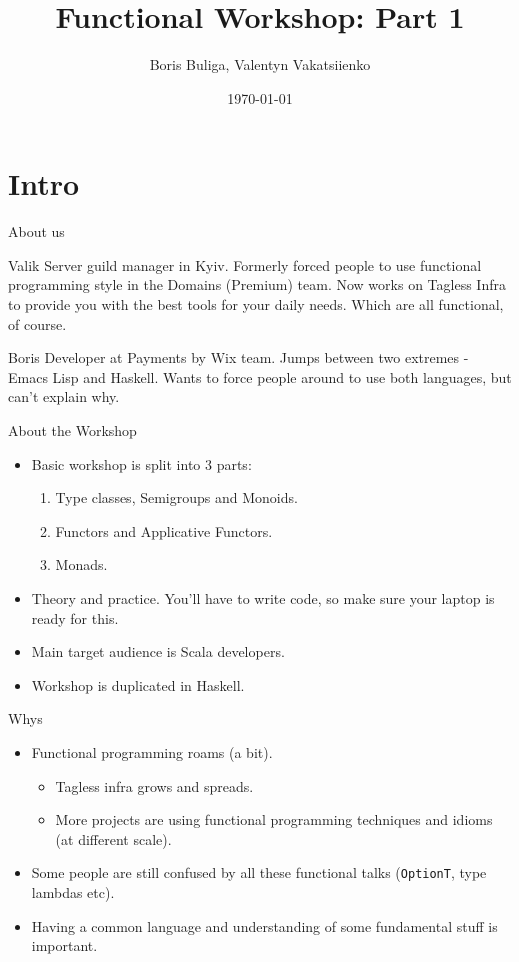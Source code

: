 \documentclass[presentation,aspectratio=169,smaller]{beamer}
\author{Boris Buliga, Valentyn Vakatsiienko}
\date{\today}
\title{Functional Workshop: Part 1}
\begin{document}
\maketitle

\section*{Intro}
\label{sec:orga3b4d36}

\begin{frame}[label={sec:org5d91517}]{About us}
\begin{block}{Valik}
Server guild manager in Kyiv. Formerly forced people to use functional
programming style in the Domains (Premium) team. Now works on Tagless Infra to
provide you with the best tools for your daily needs. Which are all functional,
of course.

\pause
\end{block}

\begin{block}{Boris}
Developer at Payments by Wix team. Jumps between two extremes - Emacs Lisp and
Haskell. Wants to force people around to use both languages, but can't explain
why.
\end{block}
\end{frame}

\begin{frame}[label={sec:org07e977a}]{About the Workshop}
\begin{itemize}
\item Basic workshop is split into 3 parts:
\begin{enumerate}
\item Type classes, Semigroups and Monoids.
\item Functors and Applicative Functors.
\item Monads.
\end{enumerate}
\item Theory and practice. You'll have to write code, so make sure your laptop is
ready for this.
\item Main target audience is Scala developers.
\item Workshop is duplicated in Haskell.
\end{itemize}
\end{frame}

\begin{frame}[label={sec:org209c76b},fragile]{Whys}
 \begin{itemize}
\item Functional programming roams (a bit).
\begin{itemize}
\item Tagless infra grows and spreads.
\item More projects are using functional programming techniques and idioms (at
different scale).
\end{itemize}
\item Some people are still confused by all these functional talks (\texttt{OptionT}, type
lambdas etc).
\item Having a common language and understanding of some fundamental stuff is
important.
\end{itemize}
\end{frame}
\end{document}

